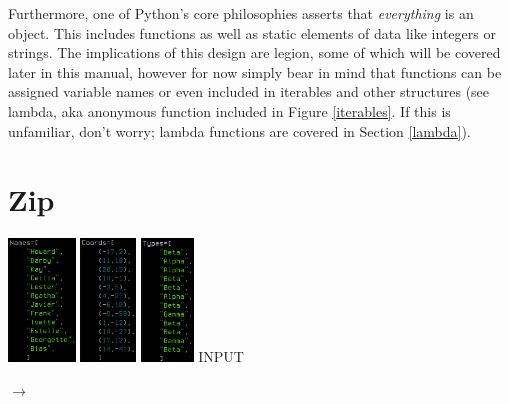 \documentclass[12pt]{article}
\begin{document}
Furthermore, one of Python's core philosophies asserts that \textit{everything} is an object. This includes functions as well as static elements of data like integers or strings. The implications of this design are legion, some of which will be covered later in this manual, however for now simply bear in mind that functions can be assigned variable names or even included in iterables and other structures (see lambda, aka anonymous function included in Figure \ref{iterables}. If this is unfamiliar, don't worry; lambda functions are covered in Section \ref{lambda}).

\newpage
\section{Zip}
\label{zip}

\begin{center}
	\begin{minipage}[c]{.4\textwidth}
		\begin{center}
		\includegraphics[height=124px]{./figures/1_zip/names.png}
		\includegraphics[height=124px]{./figures/1_zip/coords.png}
		\includegraphics[height=124px]{./figures/1_zip/types.png}
		\textsc{INPUT}
		\end{center}
	\end{minipage}
	\begin{minipage}[c]{.1\textwidth}
		\begin{center}
		\LARGE$\longrightarrow$
		\end{center}

\end{minipage}
\end{center}
\end{document}
